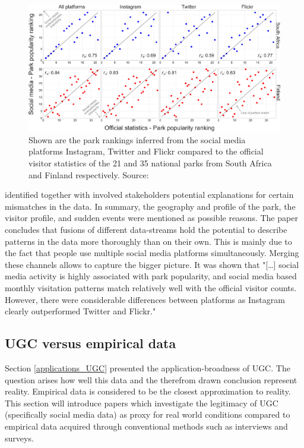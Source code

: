 \begin{figure}[!htb]
   \centering
   \includegraphics[width=\textwidth]{img/tenkanen_2017_SMPs.pdf}
   \caption{Shown are the park rankings inferred from the social media platforms Instagram, Twitter and Flickr compared to the official visitor statistics of the 21 and 35 national parks from South Africa and Finland respectively. Source: \textcite[p.4]{Tenkanen2017}}
   \label{fig:tenkanen_SMP}
\end{figure}

\textcite{Tenkanen2017} identified together with involved stakeholders potential explanations for certain mismatches in the data. In summary, the geography and profile of the park, the visitor profile, and sudden events were mentioned as possible reasons. The paper concludes that fusions of different data-streams hold the potential to describe patterns in the data more thoroughly than on their own. This is mainly due to the fact that people use multiple social media platforms simultaneously. Merging these channels allows to capture the bigger picture.
It was shown that "[\dots] social media activity is highly associated with park popularity, and social media based monthly visitation patterns match relatively well with the official visitor counts. However, there were considerable differences between platforms as Instagram clearly outperformed Twitter and Flickr."\parencite[p.1]{Tenkanen2017}

\subsection{UGC versus empirical data} \label{ugc_vs_empirical}
Section \ref{applications_UGC} presented the application-broadness of UGC. The question arises how well this data and the therefrom drawn conclusion represent reality. Empirical data is considered to be the closest approximation to reality. This section will introduce papers which investigate the legitimacy of UGC (specifically social media data) as proxy for real world conditions compared to empirical data acquired through conventional methods such as interviews and surveys. \\


